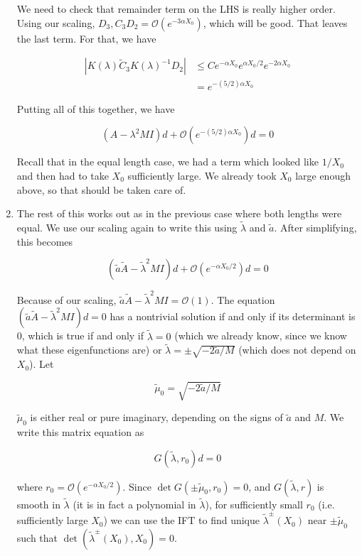 \documentclass[12pt]{article}
\begin{document}
\begin{enumerate}
We need to check that remainder term on the LHS is really higher order. Using our scaling, $D_3, C_3 D_2 = \mathcal{O}(e^{-3 \alpha X_0})$, which will be good. That leaves the last term. For that, we have

\begin{align*}
|K(\lambda) \tilde{C}_3 K(\lambda)^{-1} D_2| &\leq
C e^{-\alpha X_0} e^{\alpha X_0/2} e^{-2 \alpha X_0} \\
&= e^{-(5/2) \alpha X_0}
\end{align*}

Putting all of this together, we have 

\[
(A - \lambda^2 MI )d + \mathcal{O}\left( e^{-(5/2) \alpha X_0} \right) d = 0
\]

Recall that in the equal length case, we had a term which looked like $1/X_0$ and then had to take $X_0$ sufficiently large. We already took $X_0$ large enough above, so that should be taken care of.

\item The rest of this works out as in the previous case where both lengths were equal. We use our scaling again to write this using $\tilde{\lambda}$ and $\tilde{a}$. After simplifying, this becomes

\[
(\tilde{a}\tilde{A} - \tilde{\lambda}^2 MI )d + \mathcal{O}\left( e^{-\alpha X_0/2} \right) d = 0
\]

Because of our scaling, $\tilde{a} \tilde{A} - \tilde{\lambda}^2 M I  = \mathcal{O}(1)$. The equation $(\tilde{a} \tilde{A} - \tilde{\lambda}^2 M I )d = 0$ has a nontrivial solution if and only if its determinant is 0, which is true if and only if $\tilde{\lambda} = 0$ (which we already know, since we know what these eigenfunctions are) or $\tilde{\lambda} = \pm \sqrt{-2 \tilde{a}/M}$ (which does not depend on $X_0$). Let

\[
\tilde{\mu}_0 = \sqrt{-2 \tilde{a}/M}
\]

$\tilde{\mu}_0$ is either real or pure imaginary, depending on the signs of $\tilde{a}$ and $M$. We write this matrix equation as

\[
G(\tilde{\lambda}, r_0)d = 0
\]

where $r_0 = \mathcal{O}(e^{-\alpha X_0/2})$. Since $\det G(\pm \tilde{\mu}_0, r_0) = 0$, and $G(\tilde{\lambda}, r)$ is smooth in $\tilde{\lambda}$ (it is in fact a polynomial in $\tilde{\lambda}$), for sufficiently small $r_0$ (i.e. sufficiently large $X_0$) we can use the IFT to find unique $\tilde{\lambda}^\pm(X_0)$ near $\pm \tilde{\mu}_0$ such that $\det( \tilde{\lambda}^\pm(X_0), X_0) = 0$. \\


\end{enumerate}
\end{document}
